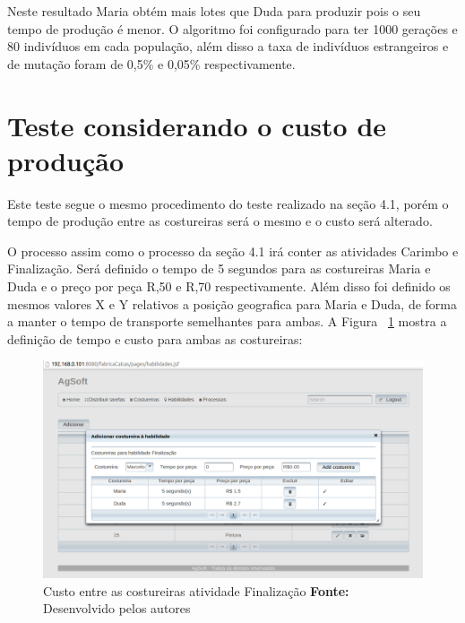 \par Neste resultado Maria obtém mais lotes que Duda para produzir pois o seu
tempo de produção é menor. O algoritmo foi configurado para ter 1000
gerações e 80 indivíduos em cada população, além disso a taxa de indivíduos estrangeiros e de mutação 
foram de 0,5\% e 0,05\% respectivamente.


\section{Teste considerando o custo de produção}

\par Este teste segue o mesmo procedimento do teste realizado na seção 4.1,
porém o tempo de produção entre as costureiras será o mesmo e o custo será
alterado.

\par O processo assim como o processo da seção 4.1 irá conter as atividades
Carimbo e Finalização. 
Será definido o tempo de 5 segundos para as costureiras Maria e Duda e o preço por 
peça R,50 e R,70 respectivamente. Além disso foi definido os mesmos valores X e Y  
relativos a posição geografica para Maria e Duda, de forma a manter o tempo de
transporte semelhantes para ambas. A Figura
~\ref{fig:custo_entre_costureiras} mostra a definição de tempo e custo para
ambas as costureiras:



\begin{figure}[h!]
	\centerline{\includegraphics[scale=0.4]{./imagens/custo_entre_costureiras_teste2.png}}
	\caption[Custo entre as costureiras atividade Finalização]
	{Custo entre as costureiras atividade Finalização \textbf{Fonte:} Desenvolvido pelos autores}
	\label{fig:custo_entre_costureiras}
\end{figure}



